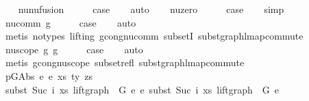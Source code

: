 \begin{isabellebody}
\ \ \isamarkupfalse%
\ nu{\isacharunderscore}{\kern0pt}nu{\isacharunderscore}{\kern0pt}fusion{}\isanewline
\ \ \isamarkupfalse%
\ \isamarkupfalse%
\ {\isacharquery}{\kern0pt}case\isanewline
\ \ \isamarkupfalse%
\ auto\isanewline
{}\isamarkupfalse%
\isanewline
\ \ \isamarkupfalse%
\ nu{\isacharunderscore}{\kern0pt}zero\isanewline
\ \ \isamarkupfalse%
\ \isamarkupfalse%
\ {\isacharquery}{\kern0pt}case\isanewline
\ \ \isamarkupfalse%
\ simp\isanewline
{}\isamarkupfalse%
\isanewline
\ \ \isamarkupfalse%
\ {\isacharparenleft}{\kern0pt}nu{\isacharunderscore}{\kern0pt}comm\ g{\isacharparenright}{\kern0pt}\isanewline
\ \ \isamarkupfalse%
\ \isamarkupfalse%
\ {\isacharquery}{\kern0pt}case\isanewline
\ \ \isamarkupfalse%
\ auto\isanewline
\ \ \isamarkupfalse%
\ {\isacharparenleft}{\kern0pt}metis\ {\isacharparenleft}{\kern0pt}no{\isacharunderscore}{\kern0pt}types{\isacharcomma}{\kern0pt}\ lifting{\isacharparenright}{\kern0pt}\ gcong{\isachardot}{\kern0pt}nu{\isacharunderscore}{\kern0pt}comm\ subsetI\ subst{\isacharunderscore}{\kern0pt}graph{\isacharunderscore}{\kern0pt}lmap{\isacharunderscore}{\kern0pt}commute{\isacharparenright}{\kern0pt}\isanewline
{}\isamarkupfalse%
\isanewline
\ \ \isamarkupfalse%
\ {\isacharparenleft}{\kern0pt}nu{\isacharunderscore}{\kern0pt}scope\ g{}\ g{}{\isacharparenright}{\kern0pt}\isanewline
\ \ \isamarkupfalse%
\ \isamarkupfalse%
\ {\isacharquery}{\kern0pt}case\isanewline
\ \ \isamarkupfalse%
\ auto\isanewline
\ \ \ \isamarkupfalse%
\ {\isacharparenleft}{\kern0pt}metis\ gcong{\isachardot}{\kern0pt}nu{\isacharunderscore}{\kern0pt}scope\ subset{\isacharunderscore}{\kern0pt}refl\ subst{\isacharunderscore}{\kern0pt}graph{\isacharunderscore}{\kern0pt}lmap{\isacharunderscore}{\kern0pt}commute{\isacharparenright}{\kern0pt}\isanewline
{}\isamarkupfalse%
\isanewline
\ \ \isamarkupfalse%
\ {\isacharparenleft}{\kern0pt}p{\isacharunderscore}{\kern0pt}GAbs\ e{}\ e{}\ xs\ ty\ zs{\isacharparenright}{\kern0pt}\isanewline
\ \ \isamarkupfalse%
\ \isamarkupfalse%
\ {\isachardoublequoteopen}subst\ {\isacharparenleft}{\kern0pt}Suc\ i{\isacharparenright}{\kern0pt}\ xs\ {\isacharparenleft}{\kern0pt}lift{\isacharunderscore}{\kern0pt}graph\ {}\ G{\isacharparenright}{\kern0pt}\ e{}\ {\isasymsimeq}e\ subst\ {\isacharparenleft}{\kern0pt}Suc\ i{\isacharparenright}{\kern0pt}\ xs\ {\isacharparenleft}{\kern0pt}lift{\isacharunderscore}{\kern0pt}graph\ {}\ G{\isacharparenright}{\kern0pt}\ e{}{\isachardoublequoteclose}\isanewline

\end{isabellebody}

